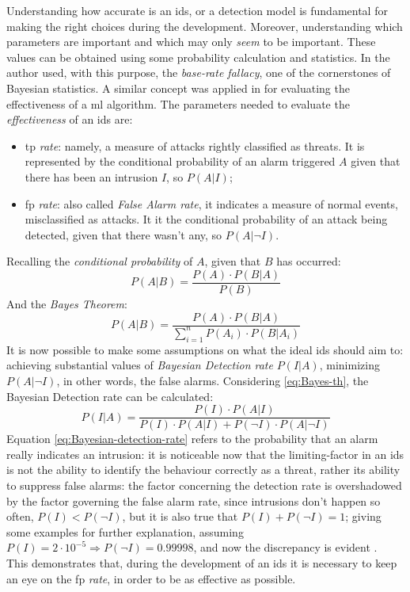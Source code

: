 Understanding how accurate is an \gls{ids}, or a detection model is fundamental for making the right choices during the development. Moreover, understanding which parameters are important and which may only \textit{seem} to be important. These values can be obtained using some probability calculation and statistics. In \cite{Axelsson2000} the author used, with this purpose, the \textit{base-rate fallacy}, one of the cornerstones of Bayesian statistics. A similar concept was applied in \cite{Liu2019} for evaluating the effectiveness of a \gls{ml} algorithm. The parameters needed to evaluate the \textit{effectiveness} of an \gls{ids} are:
\begin{itemize}
    \item[\faCaretRight] \gls{tp} \textit{rate}: namely, a measure of attacks rightly classified as threats. It is represented by the conditional probability of an alarm triggered $A$ given that there has been an intrusion $I$, so $P(A|I)$;
    \item[\faCaretRight] \gls{fp} \textit{rate}: also called \textit{False Alarm rate}, it indicates a measure of normal events, misclassified as attacks. It it the conditional probability of an attack being detected, given that there wasn't any, so $P(A|\neg I)$.
\end{itemize}
Recalling the \textit{conditional probability} of $A$, given that $B$ has occurred:
\begin{equation}
    P(A|B)=\frac{P(A)\cdot P(B|A)}{P(B)}
    \label{eq:conditional-prob}
\end{equation}
And the \textit{Bayes Theorem}:
\begin{equation}
    P(A|B)=\frac{P(A)\cdot P(B|A)}{\sum_{i=1}^nP(A_i)\cdot P(B|A_i)}
    \label{eq:Bayes-th}
\end{equation}
It is now possible to make some assumptions on what the ideal \gls{ids} should aim to: achieving substantial values of \textit{Bayesian Detection rate} $P(I|A)$, minimizing $P(A|\neg I)$, in other words, the false alarms. Considering \ref{eq:Bayes-th}, the Bayesian Detection rate can be calculated:
\begin{equation}
    P(I|A)=\frac{P(I)\cdot P(A|I)}{P(I)\cdot P(A|I)+ P(\neg I)\cdot P(A|\neg I)}
    \label{eq:Bayesian-detection-rate}
\end{equation}
Equation \ref{eq:Bayesian-detection-rate} refers to the probability that an alarm really indicates an intrusion: it is noticeable now that the limiting-factor in an \gls{ids} is not the ability to identify the behaviour correctly as a threat, rather its ability to suppress false alarms: the factor concerning the detection rate is overshadowed by the factor governing the false alarm rate, since intrusions don't happen so often, $P(I)<P(\neg I)$, but it is also true that $P(I)+P(\neg I)=1$; giving some examples for further explanation, assuming $P(I)=2\cdot 10^{-5}\Rightarrow P(\neg I)=0.99998$, and now the discrepancy is evident \cite{Axelsson2000}. \\ This demonstrates that, during the development of an \gls{ids} it is necessary to keep an eye on the \gls{fp} \textit{rate}, in order to be as effective as possible.

